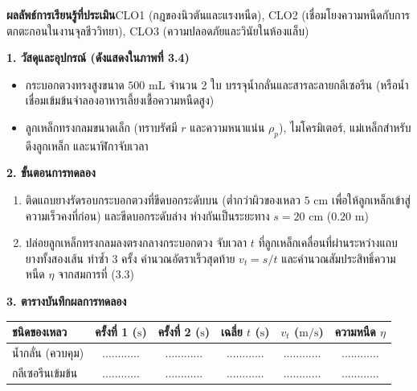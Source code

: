 \begin{labbox}
\noindent\textbf{ผลลัพธ์การเรียนรู้ที่ประเมิน}\quad CLO1 (กฎของนิวตันและแรงหนืด), CLO2 (เชื่อมโยงความหนืดกับการตกตะกอนในงานจุลชีววิทยา), CLO3 (ความปลอดภัยและวินัยในห้องแล็บ)

\vspace{4pt}
\noindent\textbf{1. วัสดุและอุปกรณ์ (ดังแสดงใน\mbox{ภาพที่} 3.4)}
\begin{itemize}
    \item กระบอกตวงทรงสูงขนาด $500\text{ mL}$ จำนวน 2 ใบ บรรจุน้ำกลั่นและสารละลายกลีเซอรีน (หรือน้ำเชื่อมเข้มข้นจำลองอาหารเลี้ยงเชื้อความหนืดสูง)
    \item ลูกเหล็กทรงกลมขนาดเล็ก (ทราบรัศมี $r$ และความหนาแน่น $\rho_p$), ไมโครมิเตอร์, แม่เหล็กสำหรับดึงลูกเหล็ก และนาฬิกาจับเวลา
\end{itemize}

\noindent\textbf{2. ขั้นตอนการทดลอง}
\begin{enumerate}
    \item ติดแถบยางรัดรอบกระบอกตวงที่ขีดบอกระดับบน (ต่ำกว่าผิวของเหลว $5\text{ cm}$ เพื่อให้ลูกเหล็กเข้าสู่ความเร็วคงที่ก่อน) และขีดบอกระดับล่าง ห่างกันเป็นระยะทาง $s = 20\text{ cm}$ ($0.20\text{ m}$)
    \item ปล่อยลูกเหล็กทรงกลมลงตรงกลางกระบอกตวง จับเวลา $t$ ที่ลูกเหล็กเคลื่อนที่ผ่านระหว่างแถบยางทั้งสองเส้น ทำซ้ำ 3 ครั้ง คำนวณอัตราเร็วสุดท้าย $v_t = s/t$ และคำนวณสัมประสิทธิ์ความหนืด $\eta$ จากสมการที่ (3.3)
\end{enumerate}

\noindent\textbf{3. ตารางบันทึกผลการทดลอง}
\begin{center}
\footnotesize\setlength{\tabcolsep}{3.5pt}
\begin{tabularx}{\linewidth}{>{\raggedright\arraybackslash}X c c c c c}
\toprule
\textbf{ชนิดของเหลว} & \textbf{ครั้งที่ 1 ($\text{s}$)} & \textbf{ครั้งที่ 2 ($\text{s}$)} & \textbf{เฉลี่ย $t$ ($\text{s}$)} & \textbf{$v_t$ ($\text{m/s}$)} & \textbf{ความหนืด $\eta$} \\
\midrule
น้ำกลั่น (ควบคุม) & ............ & ............ & ............ & ............ & ............ \\
กลีเซอรีนเข้มข้น & ............ & ............ & ............ & ............ & ............ \\
\bottomrule
\end{tabularx}
\end{center}
\end{labbox}

